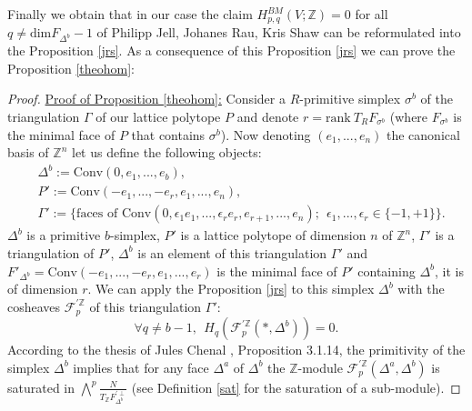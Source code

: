\documentclass{article}
\begin{document}
Finally we obtain that in our case the claim $H^{BM}_{p,q}(V;\mathbb{Z})=0$ for all $q \neq \mathrm{dim} F_{\Delta^b}-1$ of Philipp Jell, Johanes Rau, Kris Shaw can be reformulated into the Proposition \ref{jrs}. As a consequence of this Proposition \ref{jrs} we can prove the Proposition \ref{theohom}:

\begin{proof}
    \underline{Proof of Proposition \ref{theohom}:} Consider a $R$-primitive simplex $\sigma^b$ of the triangulation $\Gamma$ of our lattice polytope $P$ and denote $r=\mathrm{rank} ~ T_RF_{\sigma^b}$ (where $F_{\sigma^b}$ is the minimal face of $P$ that contains $\sigma^b$). Now denoting $(e_1,...,e_n)$ the canonical basis of $\mathbb{Z}^n$ let us define the following objects:
    \begin{align*}
        &\Delta^b:=\mathrm{Conv}(0,e_1,...,e_b),\\
        &P':=\mathrm{Conv}(-e_1,...,-e_r,e_1,...,e_n), \\
        &\Gamma':=\{\text{faces of } \mathrm{Conv}(0,\epsilon_1e_1,...,\epsilon_re_r,e_{r+1},...,e_n) ;~~\epsilon_1,...,\epsilon_r\in\{-1,+1\}\}.
    \end{align*}
    $\Delta^b$ is a primitive $b$-simplex, $P'$ is a lattice polytope of dimension $n$ of $\mathbb{Z}^n$, $\Gamma'$ is a triangulation of $P'$, $\Delta^b$ is an element of this triangulation $\Gamma'$ and $F'_{\Delta^b}=\mathrm{Conv}(-e_1,...,-e_r,e_1,...,e_r)$ is the minimal face of $P'$ containing $\Delta^b$, it is of dimension $r$. We can apply the Proposition \ref{jrs} to this simplex $\Delta^b$ with the cosheaves $\mathcal{F}_p^{'\mathbb{Z}}$ of this triangulation $\Gamma'$:
    \begin{equation*}
        \forall q \neq b-1,~~H_q(\mathcal{F}_p^{'\mathbb{Z}}(*,\Delta^b))=0.
    \end{equation*}
    According to the thesis of Jules Chenal \cite{Ch 2024}, Proposition 3.1.14, the primitivity of the simplex $\Delta^b$ implies that for any face $\Delta^a$ of $\Delta^b$ the $\mathbb{Z}$-module $\mathcal{F}_p^{'\mathbb{Z}}(\Delta^a,\Delta^b)$ is saturated in $\bigwedge^p\frac{N}{T_{\mathbb{Z}}F_{\Delta^b}^{'\perp}}$ (see Definition \ref{sat} for the saturation of a sub-module).
    

\end{proof}
\end{document}
